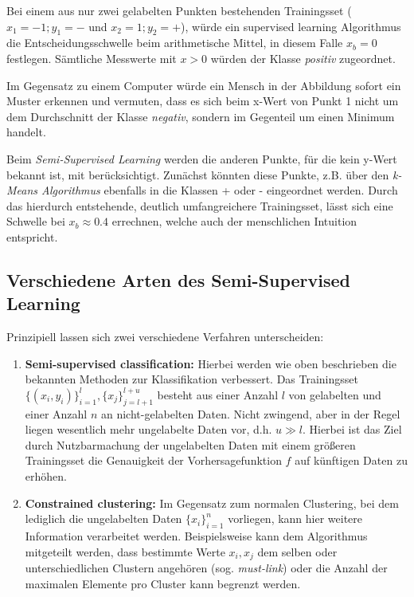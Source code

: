 \documentclass[runningheads,a4paper]{llncs}
\begin{document}
Bei einem aus nur zwei gelabelten Punkten bestehenden Trainingsset ($x_1 = -1; y_1 = -$ und $x_2 = 1; y_2 = +$), würde ein supervised learning Algorithmus die Entscheidungsschwelle beim arithmetische Mittel, in diesem Falle $x_b = 0$ festlegen. Sämtliche Messwerte mit $x > 0$ würden der Klasse \emph{positiv} zugeordnet.

Im Gegensatz zu einem Computer würde ein Mensch in der Abbildung sofort ein Muster erkennen und vermuten, dass es sich beim x-Wert von Punkt 1 nicht um dem Durchschnitt der Klasse \emph{negativ}, sondern im Gegenteil um einen Minimum handelt.

Beim \emph{Semi-Supervised Learning} werden die anderen Punkte, für die kein y-Wert bekannt ist, mit berücksichtigt. Zunächst könnten diese Punkte, z.B. über den \emph{k-Means Algorithmus} ebenfalls in die Klassen + oder - eingeordnet werden. Durch das hierdurch entstehende, deutlich umfangreichere Trainingsset, lässt sich eine Schwelle bei $x_b \approx 0.4$ errechnen, welche auch der menschlichen Intuition entspricht.


\subsection{Verschiedene Arten des Semi-Supervised Learning}


Prinzipiell lassen sich zwei verschiedene Verfahren unterscheiden\cite{zhu_goldberg_2009}: 

\begin{enumerate}

\item \textbf{Semi-supervised classification:} Hierbei werden wie oben beschrieben die bekannten Methoden zur Klassifikation verbessert. Das Trainingsset $\{(x_i, y_i)\}_{i=1}^l, \{x_j\}_{j=l+1}^{l+u}$  besteht aus einer Anzahl $l$ von gelabelten und einer Anzahl $n$ an nicht-gelabelten Daten. Nicht zwingend, aber in der Regel liegen wesentlich mehr ungelabelte Daten vor, d.h. $u \gg l$. Hierbei ist das Ziel durch Nutzbarmachung der ungelabelten Daten mit einem größeren Trainingsset die Genauigkeit der Vorhersagefunktion $f$ auf künftigen Daten zu erhöhen.

\item  \textbf{Constrained clustering:} Im Gegensatz zum normalen Clustering, bei dem lediglich die ungelabelten Daten $\{x_i\}_{i=1}^n$ vorliegen, kann hier weitere Information verarbeitet werden. Beispielsweise kann dem Algorithmus mitgeteilt werden, dass bestimmte Werte $x_i, x_j$ dem selben oder unterschiedlichen Clustern angehören (sog. \emph{must-link}) oder die Anzahl der maximalen Elemente pro Cluster kann begrenzt werden.
  

\end{enumerate}
\end{document}
